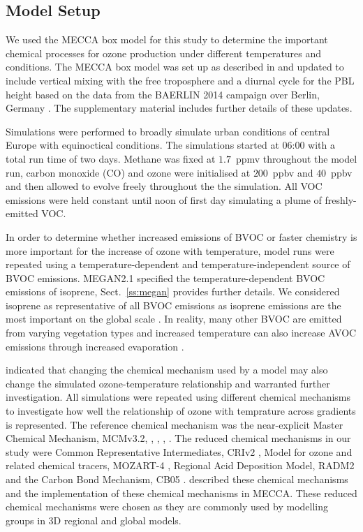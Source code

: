 \subsection{Model Setup} \label{ss:model_setup}
We used the MECCA box model for this study to determine the important chemical processes for ozone production under different temperatures and  conditions.
The MECCA box model was set up as described in \citet{Coates:2015} and updated to include vertical mixing with the free troposphere and a diurnal cycle for the PBL height based on the data from the BAERLIN 2014 campaign over Berlin, Germany \citep{Bonn:2016}. 
The supplementary material includes further details of these updates.

Simulations were performed to broadly simulate urban conditions of central Europe with equinoctical conditions.
The simulations started at 06:00 with a total run time of two days.
Methane was fixed at $1.7$~ppmv throughout the model run, carbon monoxide (CO) and ozone were initialised at $200$~ppbv and $40$~ppbv and then allowed to evolve freely throughout the the simulation.
All VOC emissions were held constant until noon of first day simulating a plume of freshly-emitted VOC.

In order to determine whether increased emissions of BVOC or faster chemistry is more important for the increase of ozone with temperature, model runs were repeated using a temperature-dependent and temperature-independent source of BVOC emissions. 
MEGAN2.1 \citep{Guenther:2012} specified the temperature-dependent BVOC emissions of isoprene, Sect.~\ref{ss:megan} provides further details. 
We considered isoprene as representative of all BVOC emissions as isoprene emissions are the most important on the global scale \citep{Guenther:2006}. 
In reality, many other BVOC are emitted from varying vegetation types \citep{Guenther:2006} and increased temperature can also increase AVOC emissions through increased evaporation \citep{Rubin:2006}.

\citet{Rasmussen:2013} indicated that changing the chemical mechanism used by a model may also change the simulated ozone-temperature relationship and warranted further investigation.
All simulations were repeated using different chemical mechanisms to investigate how well the relationship of ozone with temprature across  gradients is represented.
The reference chemical mechanism was the near-explicit Master Chemical Mechanism, MCMv3.2, \citep{Jenkin:1997}, \citep{Jenkin:2003}, \citep{Saunders:2003}, \citep{MCM_Site}.
The reduced chemical mechanisms in our study were Common Representative Intermediates, CRIv2 \citep{Jenkin:2008}, Model for ozone and related chemical tracers, MOZART-4 \citep{Emmons:2010}, Regional Acid Deposition Model, RADM2 \citep{Stockwell:1990} and the Carbon Bond Mechanism, CB05 \citep{Yarwood:2005}. 
\citet{Coates:2015} described these chemical mechanisms and the implementation of these chemical mechanisms in MECCA.
These reduced chemical mechanisms were chosen as they are commonly used by modelling groups in 3D regional and global models.

